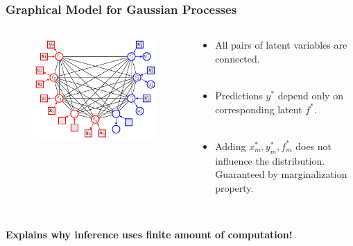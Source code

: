 \documentclass[10pt]{beamer}
\begin{document}
  \begin{frame}
    \frametitle{Graphical Model for Gaussian Processes}

    \begin{columns}
      \begin{column}{0.55\textwidth}
        \begin{figure}
          \centering
          \includegraphics[width=\textwidth]{gpModel.png}
        \end{figure}
      \end{column}
      \begin{column}{0.45\textwidth}
        \begin{itemize}
          \item All pairs of latent variables are connected.\\~
          \item Predictions $y^*$ depend only on corresponding latent $f^*$.\\~
          \item Adding $x_m^*,y_m^*,f_m^*$ does not influence the distribution. Guaranteed by marginalization property.\\~
        \end{itemize}
      \end{column}
    \end{columns}

    \begin{center}
      \textbf{Explains why inference uses finite amount of computation!}
    \end{center}
  \end{frame}
\end{document}
